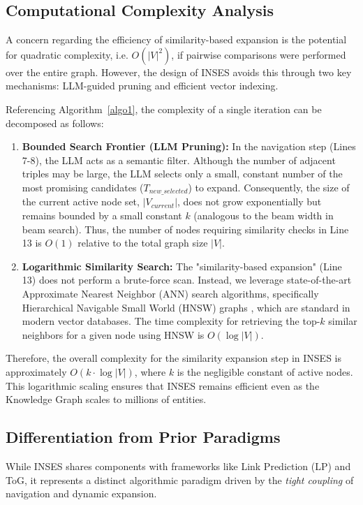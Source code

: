 \documentclass{article}
\theoremstyle{plain}
\theoremstyle{definition}
\theoremstyle{remark}
\begin{document}
\subsection{Computational Complexity Analysis}
A concern regarding the efficiency of similarity-based expansion is the potential for quadratic complexity, i.e. $O(|V|^2)$, if pairwise comparisons were performed over the entire graph. However, the design of INSES avoids this through two key mechanisms: LLM-guided pruning and efficient vector indexing.

Referencing Algorithm~\ref{algo1}, the complexity of a single iteration can be decomposed as follows:

\begin{enumerate}
    \item \textbf{Bounded Search Frontier (LLM Pruning):} 
    In the navigation step (Lines 7-8), the LLM acts as a semantic filter. Although the number of adjacent triples may be large, the LLM selects only a small, constant number of the most promising candidates ($T_{new\_selected}$) to expand. Consequently, the size of the current active node set, $|V_{current}|$, does not grow exponentially but remains bounded by a small constant $k$ (analogous to the beam width in beam search). Thus, the number of nodes requiring similarity checks in Line 13 is $O(1)$ relative to the total graph size $|V|$.

    \item \textbf{Logarithmic Similarity Search:} 
    The "similarity-based expansion" (Line 13) does not perform a brute-force scan. Instead, we leverage state-of-the-art Approximate Nearest Neighbor (ANN) search algorithms, specifically Hierarchical Navigable Small World (HNSW) graphs \citep{malkov2020efficient, malkov2014approximate}, which are standard in modern vector databases. The time complexity for retrieving the top-$k$ similar neighbors for a given node using HNSW is $O(\log |V|)$. 
\end{enumerate}

Therefore, the overall complexity for the similarity expansion step in INSES is approximately $O(k \cdot \log |V|)$, where $k$ is the negligible constant of active nodes. This logarithmic scaling ensures that INSES remains efficient even as the Knowledge Graph scales to millions of entities.

\subsection{Differentiation from Prior Paradigms}
While INSES shares components with frameworks like Link Prediction (LP) and ToG, it represents a distinct algorithmic paradigm driven by the \textit{tight coupling} of navigation and dynamic expansion.
\end{document}
